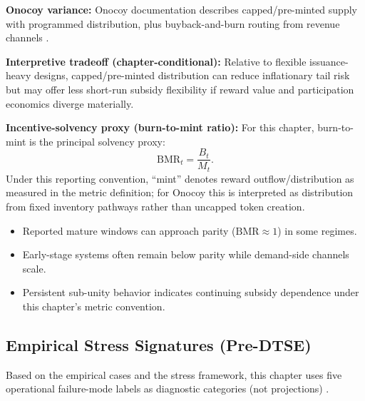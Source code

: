 \noindent\textbf{Onocoy variance:}
Onocoy documentation describes capped/pre-minted supply with programmed distribution, plus buyback-and-burn routing from revenue channels \cite{OnocoyToken, OnocoyRewards, OnocoyBonus}.

\noindent\textbf{Interpretive tradeoff (chapter-conditional):}
Relative to flexible issuance-heavy designs, capped/pre-minted distribution can reduce inflationary tail risk but may offer less short-run subsidy flexibility if reward value and participation economics diverge materially.

\noindent\textbf{Incentive-solvency proxy (burn-to-mint ratio):}
For this chapter, burn-to-mint is the principal solvency proxy:
\[
\mathrm{BMR}_t=\frac{B_t}{M_t}.
\]
Under this reporting convention, ``mint'' denotes reward outflow/distribution as measured in the metric definition; for Onocoy this is interpreted as distribution from fixed inventory pathways rather than uncapped token creation.

\begin{itemize}
    \item Reported mature windows can approach parity (\(\mathrm{BMR}\approx1\)) in some regimes.
    \item Early-stage systems often remain below parity while demand-side channels scale.
    \item Persistent sub-unity behavior indicates continuing subsidy dependence under this chapter's metric convention.
\end{itemize}

\subsection{Empirical Stress Signatures (Pre-DTSE)}
Based on the empirical cases and the stress framework, this chapter uses five operational failure-mode labels as diagnostic categories (not projections) \cite{Braakman2022, Morris2019}.

